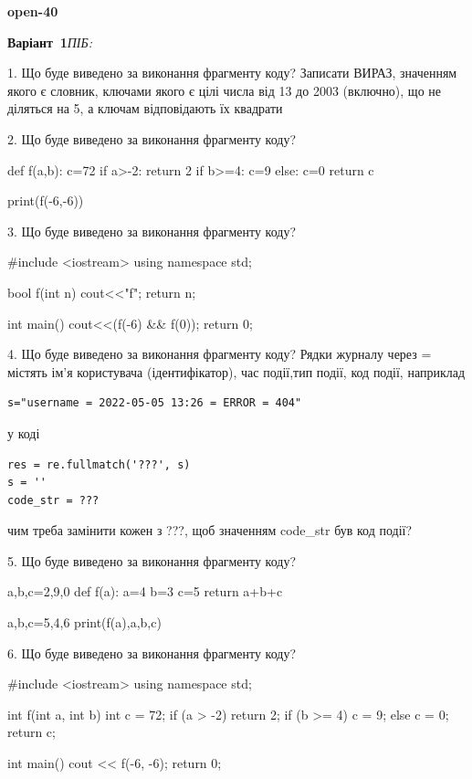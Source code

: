 \documentclass[11pt]{article}
\begin{document}
{\large\textbf{open-40}}

\textbf{Варіант \No\,1}\hfill \textit{ПІБ:}\,\underline{\hspace{60mm}}
\vspace{4mm}

1. Що буде виведено за виконання фрагменту коду?
Записати ВИРАЗ, значенням якого є словник, ключами якого є цілі числа від 13 до 2003 (включно), що не діляться на 5, а ключам відповідають їх квадрати 

2. Що буде виведено за виконання фрагменту коду?

def f(a,b):
    c=72
    if a>-2:
        return 2
    if b>=4:
         c=9
    else: 
        c=0
    return c

print(f(-6,-6))

3. Що буде виведено за виконання фрагменту коду?

#include <iostream>
using namespace std;

bool f(int n){
    cout<<"f";
    return n;
}

int main(){
    cout<<(f(-6) && f(0));
    return 0;
}

4. Що буде виведено за виконання фрагменту коду?
Рядки журналу через = містять ім'я користувача (ідентифікатор), час події,тип події, код події, наприклад
\begin{verbatim}
s="username = 2022-05-05 13:26 = ERROR = 404"
\end{verbatim}
у коді 
\begin{verbatim}
res = re.fullmatch('???', s) 
s = ''
code_str = ??? 
\end{verbatim}
чим треба замінити кожен з ???, щоб значенням code\_str був код події? 



5. Що буде виведено за виконання фрагменту коду?

a,b,c=2,9,0
def f(a):
    a=4
    b=3
    c=5
    return a+b+c

a,b,c=5,4,6
print(f(a),a,b,c)

6. Що буде виведено за виконання фрагменту коду?

#include <iostream>
using namespace std;

int f(int a, int b){
    int c = 72;
    if (a > -2)
        return 2;
    if (b >= 4)
         c = 9;
    else 
        c = 0;
    return c;
}

int main(){
    cout << f(-6, -6);
    return 0;
}
\end{document}
